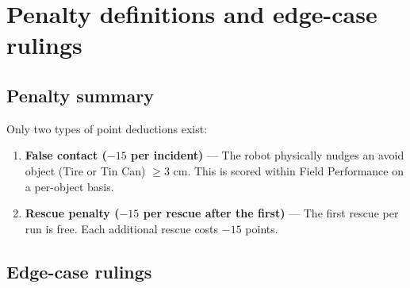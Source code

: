 \documentclass[a4]{article}
\begin{document}
\section*{Penalty definitions and edge-case rulings}
\subsection*{Penalty summary}

Only two types of point deductions exist:

\begin{enumerate}
    \item \textbf{False contact ($-15$ per incident)} --- The robot physically nudges an avoid object (Tire or Tin Can) $\geq$3 cm. This is scored within Field Performance on a per-object basis.
    \item \textbf{Rescue penalty ($-15$ per rescue after the first)} --- The first rescue per run is free. Each additional rescue costs $-15$ points.
\end{enumerate}

\subsection*{Edge-case rulings}
\end{document}
